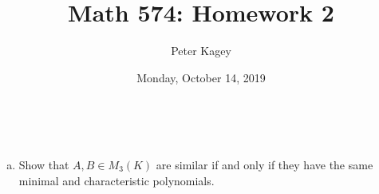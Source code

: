 \documentclass{article}
\begin{document}
\title{Math 574: Homework 2}
\author{Peter Kagey}
\date{Monday, October 14, 2019}

\maketitle

\begin{problem}{1} ~
  \begin{enumerate}[(a)]
    \item Show that $A, B \in M_3(K)$ are similar if and only if they have the
    same minimal and characteristic polynomials.
  \end{enumerate}
\end{problem}
\end{document}
